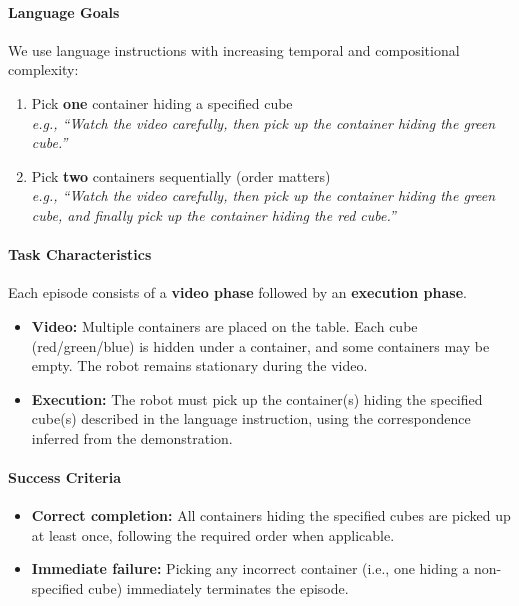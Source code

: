 \paragraph{Language Goals}
We use language instructions with increasing temporal and compositional complexity:
\begin{enumerate}[itemsep=1pt, topsep=0pt, leftmargin=*]
    \item Pick \textbf{one} container hiding a specified cube \\
    \textit{e.g., ``Watch the video carefully, then pick up the container hiding the green cube.''}
    
    \item Pick \textbf{two} containers sequentially (order matters) \\
    \textit{e.g., ``Watch the video carefully, then pick up the container hiding the green cube, and finally pick up the container hiding the red cube.''}
\end{enumerate}

\paragraph{Task Characteristics}
Each episode consists of a \textbf{video phase} followed by an \textbf{execution phase}.
\begin{itemize}[itemsep=1pt, topsep=0pt, leftmargin=*]
    \item \textbf{Video:} Multiple containers are placed on the table. Each cube (red/green/blue) is hidden under a container, and some containers may be empty. The robot remains stationary during the video.
    
    \item \textbf{Execution:} The robot must pick up the container(s) hiding the specified cube(s) described in the language instruction, using the correspondence inferred from the demonstration.
\end{itemize}

\paragraph{Success Criteria}
\begin{itemize}[itemsep=1pt, topsep=0pt, leftmargin=*]
    \item \textbf{Correct completion:} All containers hiding the specified cubes are picked up at least once, following the required order when applicable.
    
    \item \textbf{Immediate failure:} Picking any incorrect container (i.e., one hiding a non-specified cube) immediately terminates the episode.
\end{itemize}



